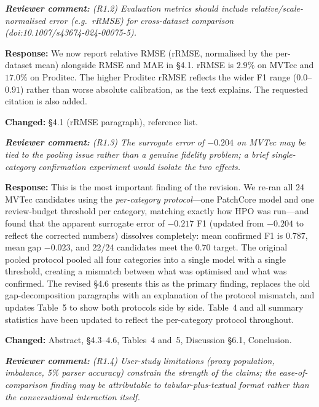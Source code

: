 \documentclass[11pt,a4paper]{article}
\newcommand{\revquote}[1]{\smallskip\noindent\textit{\textbf{Reviewer comment:} #1}\smallskip}
\newcommand{\response}[1]{\noindent\textbf{Response:} #1\par}
\begin{document}
\bigskip

\revquote{(R1.2) Evaluation metrics should include relative/scale-normalised
error (e.g.\ rRMSE) for cross-dataset comparison
(doi:10.1007/s43674-024-00075-5).}

\response{We now report relative RMSE (rRMSE, normalised by the
per-dataset mean) alongside RMSE and MAE in \S4.1.
rRMSE is $2.9\%$ on MVTec and $17.0\%$ on Proditec.
The higher Proditec rRMSE reflects the wider F1 range ($0.0$--$0.91$)
rather than worse absolute calibration, as the text explains. The
requested citation is also added.

\noindent\textbf{Changed:} \S4.1 (rRMSE paragraph), reference list.}

\bigskip

\revquote{(R1.3) The surrogate error of $-0.204$ on MVTec may be tied to the
pooling issue rather than a genuine fidelity problem; a brief
single-category confirmation experiment would isolate the two effects.}

\response{This is the most important finding of the revision.
We re-ran all 24 MVTec candidates using the \emph{per-category
protocol}---one PatchCore model and one review-budget threshold per
category, matching exactly how HPO was run---and found that the apparent
surrogate error of $-0.217$ F1 (updated from $-0.204$ to reflect the
corrected numbers) dissolves completely: mean confirmed F1 is $0.787$,
mean gap $-0.023$, and 22/24 candidates meet the $0.70$ target.
The original pooled protocol pooled all four categories into a single
model with a single threshold, creating a mismatch between what was
optimised and what was confirmed. The revised \S4.6 presents this as
the primary finding, replaces the old gap-decomposition paragraphs with
an explanation of the protocol mismatch, and updates Table~5 to show
both protocols side by side. Table~4 and all summary statistics have
been updated to reflect the per-category protocol throughout.

\noindent\textbf{Changed:} Abstract, \S4.3--4.6, Tables~4 and~5, Discussion
\S6.1, Conclusion.}

\bigskip

\revquote{(R1.4) User-study limitations (proxy population, imbalance,
5\% parser accuracy) constrain the strength of the claims; the
ease-of-comparison finding may be attributable to tabular-plus-textual
format rather than the conversational interaction itself.}
\end{document}
